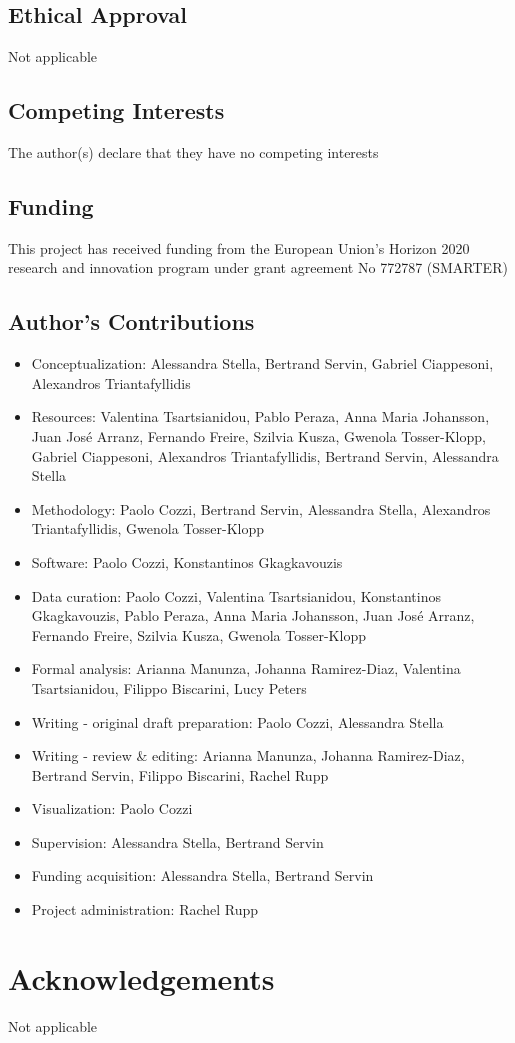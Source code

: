 \documentclass[a4paper,num-refs,gigabyte]{oup-contemporary}
\begin{document}
\subsection{Ethical Approval}

Not applicable

\subsection{Competing Interests}

The author(s) declare that they have no competing interests

\subsection{Funding}

This project has received funding from the European Union’s Horizon 2020 research and innovation program under grant agreement No 772787 (SMARTER)

\subsection{Author's Contributions}

\begin{itemize}
\item Conceptualization: Alessandra Stella, Bertrand Servin, Gabriel Ciappesoni, Alexandros Triantafyllidis
\item Resources: Valentina Tsartsianidou, Pablo Peraza, {Anna Maria} Johansson, {Juan José} Arranz, Fernando Freire, Szilvia Kusza, Gwenola Tosser-Klopp, Gabriel Ciappesoni, Alexandros Triantafyllidis, Bertrand Servin, Alessandra Stella
\item Methodology: Paolo Cozzi, Bertrand Servin, Alessandra Stella, Alexandros Triantafyllidis, Gwenola Tosser-Klopp
\item Software: Paolo Cozzi, Konstantinos Gkagkavouzis
\item Data curation: Paolo Cozzi, Valentina Tsartsianidou, Konstantinos Gkagkavouzis, Pablo Peraza, {Anna Maria} Johansson, {Juan José} Arranz, Fernando Freire, Szilvia Kusza, Gwenola Tosser-Klopp
\item Formal analysis: Arianna Manunza, Johanna Ramirez-Diaz, Valentina Tsartsianidou, Filippo Biscarini, Lucy Peters
\item Writing - original draft preparation: Paolo Cozzi, Alessandra Stella
\item Writing - review \& editing: Arianna Manunza, Johanna Ramirez-Diaz, Bertrand Servin, Filippo Biscarini, Rachel Rupp
\item Visualization: Paolo Cozzi
\item Supervision: Alessandra Stella, Bertrand Servin
\item Funding acquisition: Alessandra Stella, Bertrand Servin
\item Project administration: Rachel Rupp
\end{itemize}

\section{Acknowledgements}

Not applicable


\end{document}
